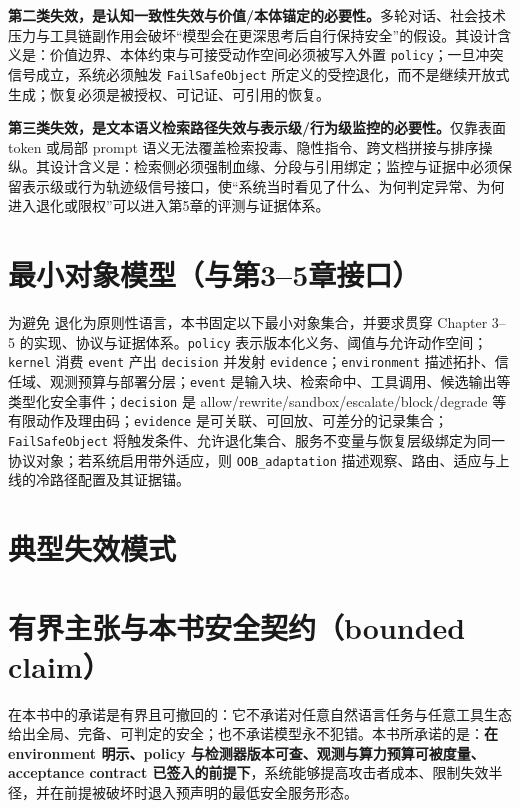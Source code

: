 \documentclass[11pt,a4paper]{report}
\begin{document}
\textbf{第二类失效，是认知一致性失效与价值/本体锚定的必要性。}多轮对话、社会技术压力与工具链副作用会破坏“模型会在更深思考后自行保持安全”的假设。其设计含义是：价值边界、本体约束与可接受动作空间必须被写入外置 \texttt{policy}；一旦冲突信号成立，系统必须触发 \texttt{FailSafeObject} 所定义的受控退化，而不是继续开放式生成；恢复必须是被授权、可记证、可引用的恢复。

\textbf{第三类失效，是文本语义检索路径失效与表示级/行为级监控的必要性。}仅靠表面 token 或局部 prompt 语义无法覆盖检索投毒、隐性指令、跨文档拼接与排序操纵。其设计含义是：检索侧必须强制血缘、分段与引用绑定；监控与证据中必须保留表示级或行为轨迹级信号接口，使“系统当时看见了什么、为何判定异常、为何进入退化或限权”可以进入第5章的评测与证据体系。

\section{最小对象模型（与第3--5章接口）}
为避免 \DecoupledSafety{} 退化为原则性语言，本书固定以下最小对象集合，并要求贯穿 Chapter 3--5 的实现、协议与证据体系。\texttt{policy} 表示版本化义务、阈值与允许动作空间；\texttt{kernel} 消费 \texttt{event} 产出 \texttt{decision} 并发射 \texttt{evidence}；\texttt{environment} 描述拓扑、信任域、观测预算与部署分层；\texttt{event} 是输入块、检索命中、工具调用、候选输出等类型化安全事件；\texttt{decision} 是 allow/rewrite/sandbox/escalate/block/degrade 等有限动作及理由码；\texttt{evidence} 是可关联、可回放、可差分的记录集合；\texttt{FailSafeObject} 将触发条件、允许退化集合、服务不变量与恢复层级绑定为同一协议对象；若系统启用带外适应，则 \texttt{OOB\_adaptation} 描述观察、路由、适应与上线的冷路径配置及其证据锚。

\section{典型失效模式}

\section{有界主张与本书安全契约（bounded claim）}
\DecoupledSafety{} 在本书中的承诺是有界且可撤回的：它不承诺对任意自然语言任务与任意工具生态给出全局、完备、可判定的安全；也不承诺模型永不犯错。本书所承诺的是：\textbf{在 environment 明示、policy 与检测器版本可查、观测与算力预算可被度量、acceptance contract 已签入的前提下}，系统能够提高攻击者成本、限制失效半径，并在前提被破坏时退入预声明的最低安全服务形态。
\end{document}
